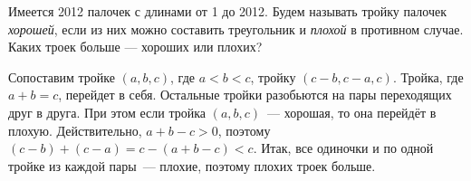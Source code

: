Имеется 2012 палочек с длинами от 1 до 2012.
Будем называть тройку палочек \emph{хорошей}, если из них можно составить
треугольник и \emph{плохой} в противном случае.
Каких троек больше --- хороших или плохих?

\solution
Сопоставим тройке $(a, b, c)$, где $a < b < c$, тройку $(c - b, c - a, c)$.
Тройка, где $a + b = c$, перейдет в себя.
Остальные тройки разобьются на пары переходящих друг в друга.
При этом если тройка $(a, b, c)$~--- хорошая, то она перейдёт в плохую.
Действительно, $a + b - c > 0$, поэтому
$(c - b) + (c - a) = c - (a + b - c) < c$.
Итак, все одиночки и по одной тройке из каждой пары~--- плохие, поэтому плохих
троек больше.


